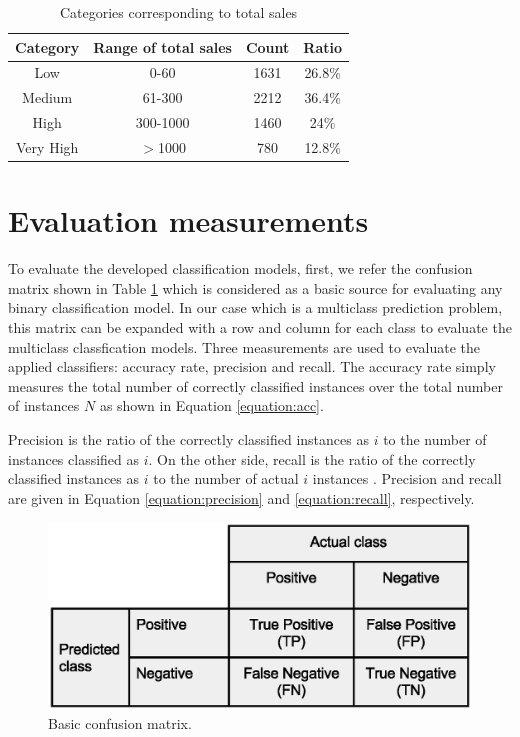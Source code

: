 \documentclass{llncs}
\begin{document}
\begin{table}[ht]
\caption{Categories corresponding to total sales }
\centering{}%
\begin{tabular}{|c|c|c|c|}
\hline 
Category & Range of total sales & Count & Ratio\tabularnewline
\hline 
\hline 
Low & 0-60 & 1631 & 26.8\%\tabularnewline
\hline 
Medium & 61-300 & 2212 & 36.4\%\tabularnewline
\hline 
High & 300-1000 & 1460 & 24\%\tabularnewline
\hline 
Very High & $>$1000 & 780 & 12.8\%\tabularnewline
\hline 
\end{tabular}
\label{table:freq}
\end{table}



\section{Evaluation measurements}

To evaluate the developed classification models, first, we refer the confusion matrix shown in Table \ref{fig:confusionmatrix} which is considered as a basic source for evaluating any binary classification model. In our case which is a multiclass prediction problem, this matrix can be expanded with a row and column for each class to evaluate the multiclass classfication models. Three measurements are used to evaluate the applied classifiers: accuracy rate, precision and recall. The accuracy rate simply measures the total number of correctly classified instances over the total number of instances $N$ as shown in Equation \ref{equation:acc}.

Precision is the ratio of the correctly classified instances as $i$ to the number of instances classified as $i$. On the other side, recall is the ratio of the correctly classified instances as $i$ to the number of actual $i$ instances . Precision and recall are given in Equation \ref{equation:precision} and \ref{equation:recall}, respectively.


\begin{figure}[ht]
\begin{center}
\includegraphics[scale=0.50]{confusion-matrix}
\end{center}
\caption{Basic confusion matrix.}
\label{fig:confusionmatrix}
\end{figure}
\end{document}
